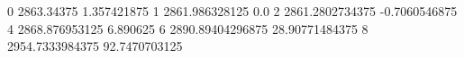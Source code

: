 0 2863.34375 1.357421875
1 2861.986328125 0.0
2 2861.2802734375 -0.7060546875
4 2868.876953125 6.890625
6 2890.89404296875 28.90771484375
8 2954.7333984375 92.7470703125
